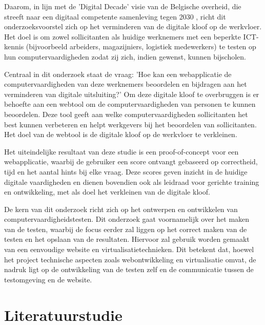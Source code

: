 Daarom, in lijn met de 'Digital Decade' visie van de Belgische overheid, die streeft naar een digitaal competente samenleving tegen 2030 \autocite{DigitalDecade2030}, richt dit onderzoeksvoorstel zich op het verminderen van de digitale kloof op de werkvloer. Het doel is om zowel sollicitanten als huidige werknemers met een beperkte ICT-kennis (bijvoorbeeld arbeiders, magazijniers, logistiek medewerkers) te testen op hun computervaardigheden zodat zij zich, indien gewenst, kunnen bijscholen.

Centraal in dit onderzoek staat de vraag: 'Hoe kan een webapplicatie de computervaardigheden van deze werknemers beoordelen en bijdragen aan het verminderen van digitale uitsluiting?' Om deze digitale kloof te overbruggen is er behoefte aan een webtool om de computervaardigheden van personen te kunnen beoordelen.
Deze tool geeft aan welke computervaardigheden sollicitanten het best kunnen verbeteren en helpt werkgevers bij het beoordelen van sollicitanten. Het doel van de webtool is de digitale kloof op de werkvloer te verkleinen.

Het uiteindelijke resultaat van deze studie is een proof-of-concept voor een webapplicatie, wa\-arbij de gebruiker een score ontvangt gebaseerd op correctheid, tijd en het aantal hints bij elke vraag. Deze scores geven inzicht in de huidige digitale vaardigheden en dienen bovendien ook als leidraad voor gerichte training en ontwikkeling, met als doel het verkleinen van de digitale kloof.

De kern van dit onderzoek richt zich op het ontwerpen en ontwikkelen van computervaardigheidstesten. Dit onderzoek gaat voornamelijk over het maken van de testen, waarbij de focus eerder zal liggen op het correct maken van de testen en het opslaan van de resultaten. Hiervoor zal gebruik worden gemaakt van een eenvoudige website en virtualisatietechnieken. Dit betekent dat, hoewel het project technische aspecten zoals webontwikkeling en virtualisatie omvat, de nadruk ligt op de ontwikkeling van de testen zelf en de communicatie tussen de testomgeving en de website.


\section{Literatuurstudie}%
\label{sec:state-of-the-art}



